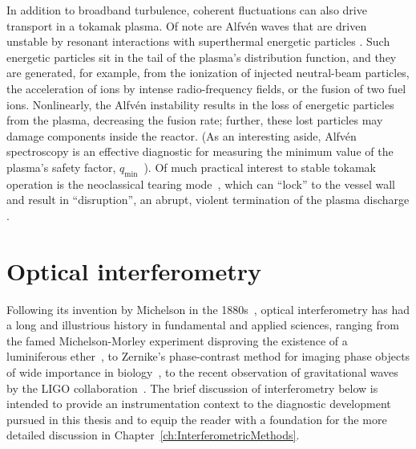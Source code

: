 In addition to broadband turbulence,
coherent fluctuations can also drive transport in a tokamak plasma.
Of note are Alfv\'{e}n waves that are driven unstable
by resonant interactions with superthermal energetic particles
\cite{wesson,heidbrink_pp08}.
Such energetic particles sit in the tail
of the plasma's distribution function, and
they are generated, for example, from
the ionization of injected neutral-beam particles,
the acceleration of ions by intense radio-frequency fields, or
the fusion of two fuel ions.
Nonlinearly, the Alfv\'{e}n instability
results in the loss of energetic particles from the plasma,
decreasing the fusion rate;
further, these lost particles may damage components inside the reactor.
(As an interesting aside, Alfv\'{e}n spectroscopy is an effective diagnostic
for measuring the minimum value of the plasma's safety factor,
$q_{\text{min}}$~\cite{wesson,edlund_prl09,breizman_pp05}).
Of much practical interest to stable tokamak operation
is the neoclassical tearing mode~\cite[Sec.~7.3]{wesson},
which can ``lock'' to the vessel wall~\cite[Sec.~7.10]{wesson}
and result in ``disruption'',
an abrupt, violent termination of the plasma discharge
\cite[Sec.~7.7-7.9]{wesson}.


\section{Optical interferometry}
Following its invention by Michelson in the 1880s~\cite{nobel_prize_michelson},
optical interferometry has had a long and illustrious history
in fundamental and applied sciences, ranging from
the famed Michelson-Morley experiment
disproving the existence of a luminiferous ether~\cite{michelson_ajs1887},
to Zernike's phase-contrast method for imaging phase objects
of wide importance in biology~\cite{nobel_prize_zernike},
to the recent observation of gravitational waves
by the LIGO collaboration~\cite{ligo_prl16}.
The brief discussion of interferometry below is intended
to provide an instrumentation context
to the diagnostic development pursued in this thesis and
to equip the reader with a foundation
for the more detailed discussion in
Chapter~\ref{ch:InterferometricMethods}.

